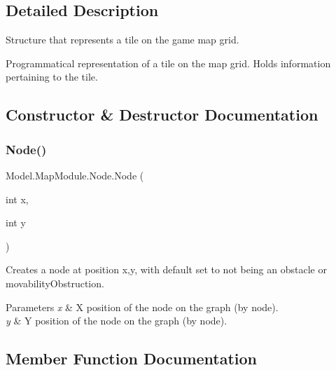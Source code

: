 \subsection{Detailed Description}
Structure that represents a tile on the game map grid. 

Programmatical representation of a tile on the map grid. Holds information pertaining to the tile. 

\subsection{Constructor \& Destructor Documentation}
\hypertarget{class_model_1_1_map_module_1_1_node_a519d0765e3b91e7e19c1aa0db44696d9}{}\label{class_model_1_1_map_module_1_1_node_a519d0765e3b91e7e19c1aa0db44696d9} 
\subsubsection{\texorpdfstring{Node()}{Node()}}
{\footnotesize\ttfamily Model.\+Map\+Module.\+Node.\+Node (\begin{DoxyParamCaption}\item[{int}]{x,  }\item[{int}]{y }\end{DoxyParamCaption})\hspace{0.3cm}{\ttfamily [inline]}}

Creates a node at position x,y, with default set to not being an obstacle or movability\+Obstruction. 
\begin{DoxyParams}{Parameters}
{\em x} & X position of the node on the graph (by node). \\
\hline
{\em y} & Y position of the node on the graph (by node). \\
\hline
\end{DoxyParams}


\subsection{Member Function Documentation}
\hypertarget{class_model_1_1_map_module_1_1_node_ac584afe840f0eccf88221ba551b47e3a}{}\label{class_model_1_1_map_module_1_1_node_ac584afe840f0eccf88221ba551b47e3a} 
